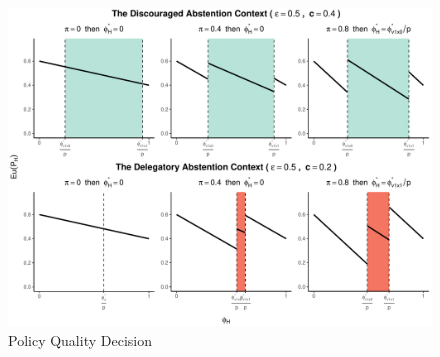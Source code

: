 \documentclass[doc,natbib,12pt]{apa6}\usepackage[]{graphicx}\usepackage[]{color}
\makeatletter
\def\maxwidth{ %
  \ifdim\Gin@nat@width>\linewidth
    \linewidth
  \else
    \Gin@nat@width
  \fi
}
\newenvironment{knitrout}{}{} %
\makeatother
\begin{document}
\begin{knitrout}
\color{fgcolor}\begin{figure}[h!!!]

{\centering \includegraphics[width=\maxwidth]{figure/eupgraph-1} 

}

\caption[Policy Quality Decision]{Policy Quality Decision}\label{fig:eupgraph}
\end{figure}


\end{knitrout}
			
\end{document}
